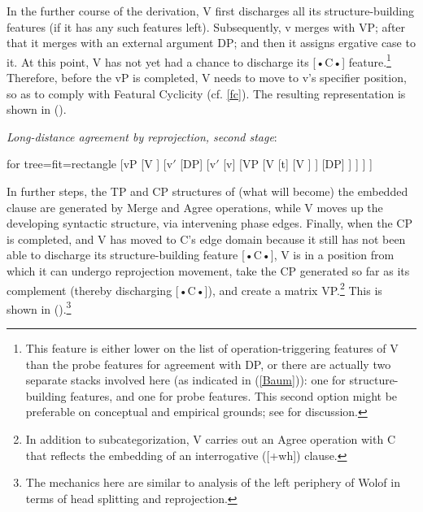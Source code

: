 \documentclass[output=paper
,modfonts
,nonflat]{langsci/langscibook}
\begin{document}
	In the further course of the derivation, V first discharges all its
	structure-building features (if it has any such features
	left). Subsequently, v merges with VP; after that it merges 
	with an external argument DP; and then it assigns ergative case to it. At
	this point, V has not yet had a chance to discharge its [•C•] feature.\footnote{This
		feature is either lower on the list of operation-triggering
		features of V than the probe features for agreement with
		DP, or there are actually two separate stacks involved here
		(as indicated in (\ref{Baum})):
		one for structure-building features, and one for probe
		features. This second option might be preferable on conceptual and empirical
		grounds; see \cite{Mueller:04:arg,Mueller:09:eao} for discussion.}
	Therefore, before
	the vP is completed, V needs to move to v's specifier position, so
	as to comply with Featural Cyclicity (cf. \ref{fc}). The resulting
	representation is shown in (\Next).
	
		\begin{exe}
			\ex	\label{ex:mueller:33} \textit{Long-distance agreement by reprojection, second stage}:\\\label{Baum2}
				\begin{forest} 	for tree={fit=rectangle}
					[vP
					[V ]
					[v$'$
					[DP]
					[v$'$
					[v] 
					[VP
					[V
					[t]
					[V  ] ]
					[DP]
					] ] ] ]	
			\end{forest}
		\end{exe}
\noindent In further steps, the TP and CP structures of (what will become) the
	embedded clause are generated by Merge and Agree operations, while V moves up
	the developing syntactic structure, via intervening phase
	edges. Finally, when the CP is completed, and V has moved to C's
	edge domain because it still has not been able to discharge its
	structure-building feature [•C•], V is in a position from which it
	can undergo reprojection movement, take the CP generated so far as
	its complement (thereby discharging [•C•]), and create a matrix
	VP.\footnote{In addition to subcategorization, V carries out an
		Agree operation with C that reflects the embedding of an
		interrogative ([+wh]) clause.} This is
	shown in (\Next).\footnote{The mechanics here are similar to 
		 analysis of the left periphery of Wolof
		in terms of head splitting and reprojection.}\largerpage[-3]   
\end{document}
